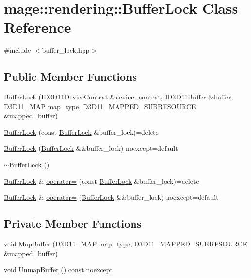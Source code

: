 \hypertarget{classmage_1_1rendering_1_1_buffer_lock}{}\section{mage\+:\+:rendering\+:\+:Buffer\+Lock Class Reference}
\label{classmage_1_1rendering_1_1_buffer_lock}


{\ttfamily \#include $<$buffer\+\_\+lock.\+hpp$>$}

\subsection*{Public Member Functions}
\begin{DoxyCompactItemize}
\item 
\hyperlink{classmage_1_1rendering_1_1_buffer_lock_a548c15e53e0903471268c83f16126f43}{Buffer\+Lock} (I\+D3\+D11\+Device\+Context \&device\+\_\+context, I\+D3\+D11\+Buffer \&buffer, D3\+D11\+\_\+\+M\+AP map\+\_\+type, D3\+D11\+\_\+\+M\+A\+P\+P\+E\+D\+\_\+\+S\+U\+B\+R\+E\+S\+O\+U\+R\+CE \&mapped\+\_\+buffer)
\item 
\hyperlink{classmage_1_1rendering_1_1_buffer_lock_a8804d6bd8626c71aac68bf9a5cf4c1f3}{Buffer\+Lock} (const \hyperlink{classmage_1_1rendering_1_1_buffer_lock}{Buffer\+Lock} \&buffer\+\_\+lock)=delete
\item 
\hyperlink{classmage_1_1rendering_1_1_buffer_lock_ad1f7ea416870a58043c505404115327e}{Buffer\+Lock} (\hyperlink{classmage_1_1rendering_1_1_buffer_lock}{Buffer\+Lock} \&\&buffer\+\_\+lock) noexcept=default
\item 
\hyperlink{classmage_1_1rendering_1_1_buffer_lock_ae7ce340c09dc0698aedf33aeb66b14c6}{$\sim$\+Buffer\+Lock} ()
\item 
\hyperlink{classmage_1_1rendering_1_1_buffer_lock}{Buffer\+Lock} \& \hyperlink{classmage_1_1rendering_1_1_buffer_lock_ae246c49ce47dbff7ac9f08e309e90339}{operator=} (const \hyperlink{classmage_1_1rendering_1_1_buffer_lock}{Buffer\+Lock} \&buffer\+\_\+lock)=delete
\item 
\hyperlink{classmage_1_1rendering_1_1_buffer_lock}{Buffer\+Lock} \& \hyperlink{classmage_1_1rendering_1_1_buffer_lock_a625ec83f70daddaedc2cb0533b982c74}{operator=} (\hyperlink{classmage_1_1rendering_1_1_buffer_lock}{Buffer\+Lock} \&\&buffer\+\_\+lock) noexcept=default
\end{DoxyCompactItemize}
\subsection*{Private Member Functions}
\begin{DoxyCompactItemize}
\item 
void \hyperlink{classmage_1_1rendering_1_1_buffer_lock_a88693ae3717c7098d5cc2313cd16b8a6}{Map\+Buffer} (D3\+D11\+\_\+\+M\+AP map\+\_\+type, D3\+D11\+\_\+\+M\+A\+P\+P\+E\+D\+\_\+\+S\+U\+B\+R\+E\+S\+O\+U\+R\+CE \&mapped\+\_\+buffer)
\item 
void \hyperlink{classmage_1_1rendering_1_1_buffer_lock_a19ebd740876eea3b7d418bef505c47d7}{Unmap\+Buffer} () const noexcept
\end{DoxyCompactItemize}
